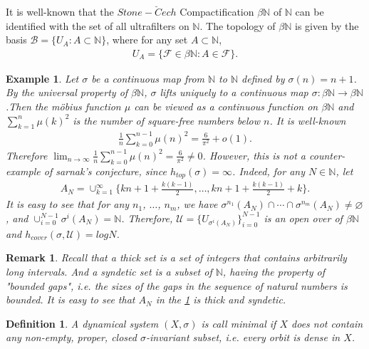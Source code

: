 \documentclass[a4paper,10pt]{amsart}
\newtheorem{example}{Example}[section]
\newtheorem{definition}{Definition}[section]
\newtheorem{remark}{Remark}[section]
\newcommand{\UUU}{\mathcal U}
\newcommand{\FFF}{\mathcal F}
\newcommand{\N}{\mathbb N} %
\begin{document}
It is well-known that the $Stone-\breve{C}ech$ Compactification
$\beta \N$ of $\N$ can be identified with the set of all ultrafilters 
on $\N$. The topology of $\beta \N$ is given by the basis 
$\mathcal{B}= \{ U_{A}: A \subset \N\}$, where for any set $A \subset \N$,
\begin{align*}
    U_{A}=\{\FFF \in \beta \N: A \in \FFF \}. 
\end{align*}

\begin{example}\label{scexp1}
   Let $\sigma$ be a continuous map from $\N$ to $\N$ defined by
   $\sigma(n) = n+1$. By the universal property of $\beta \N$, $\sigma$
   lifts uniquely to a continuous map $\sigma: \beta \N \rightarrow 
   \beta \N$.Then the m\"{o}bius function 
   $\mu$ can be viewed as a continuous
   function on $\beta \N$ and $\sum_{k=1}^{n}\mu(k)^2$ is the number 
   of square-free numbers below $n$. It is well-known
   \begin{align*}
       \frac{1}{n}\sum_{k=0}^{n-1}\mu(n)^2 = \frac{6}{\pi^2} + o(1).
   \end{align*}
   Therefore $\lim_{n \rightarrow \infty}\frac{1}{n}
   \sum_{k=0}^{n-1}\mu(n)^2 = \frac{6}{\pi^2} \neq 0$. 
   However, this is not a counter-example of sarnak's conjecture, 
   since $h_{top}(\sigma) = \infty$.
   Indeed, for any $N \in \N$, let 
   \begin{align*}
       A_{N}= \cup_{k=1}^{\infty}
       \{kn+1+\frac{k(k-1)}{2}, \ldots, kn+1+\frac{k(k-1)}{2}+k\}.
   \end{align*}
   It is easy to see that for any $n_1$, $\ldots$, $n_m$, we have
   $\sigma^{n_1}(A_{N}) \cap \cdots \cap \sigma^{n_m}(A_{N}) 
   \neq \varnothing$, and $\cup^{N-1}_{i=0}\sigma^{i}(A_{N}) = \N$.
   Therefore, $\UUU = \{U_{\sigma^{i}(A_N)} \}_{i=0}^{N-1}$ is an open
   over of $\beta \N$ and $h_{cover}(\sigma, \UUU) = logN$.
\end{example}

\begin{remark}
    Recall that a thick set is a set of integers that contains 
    arbitrarily long intervals. And a syndetic set is a subset of $\N$, 
    having the property of "bounded gaps", i.e. the sizes of the gaps 
    in the sequence of natural numbers is bounded. It is easy to see that
    $A_{N}$ in the \cref{scexp1} is thick and syndetic. 
\end{remark}

\begin{definition}
    A dynamical system $(X, \sigma)$ is call minimal if $X$ does not
    contain any non-empty, proper, closed $\sigma$-invariant subset, 
    i.e. every orbit is dense in $X$.
\end{definition}
\end{document}

